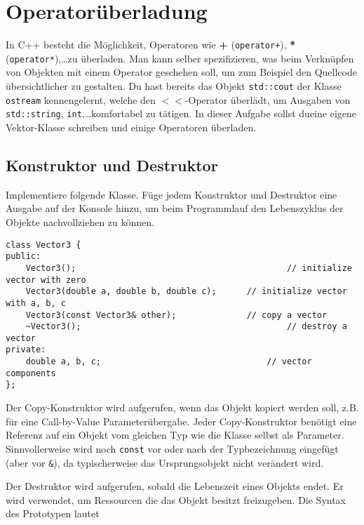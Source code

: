 \section{Operatorüberladung}
In C++ besteht die Möglichkeit, Operatoren wie \textbf{+} (\texttt{operator+}), \textbf{*} (\texttt{operator*}),\dots zu überladen.
Man kann selber spezifizieren, was beim Verknüpfen von Objekten mit einem Operator geschehen soll, um zum Beispiel den Quellcode übersichtlicher zu gestalten.
Du hast bereits das Objekt \texttt{std::cout} der Klasse \texttt{ostream} kennengelernt, welche den $<<$-Operator überlädt, um Ausgaben von \texttt{std::string}, \texttt{int},\dots komfortabel zu tätigen.
In dieser Aufgabe sollst dueine eigene Vektor-Klasse schreiben und einige Operatoren überladen.


\subsection{Konstruktor und Destruktor}
Implementiere folgende Klasse.
Füge jedem Konstruktor und Destruktor eine Ausgabe auf der Konsole hinzu, um beim Programmlauf den Lebenszyklus der Objekte nachvollziehen zu können.

\begin{lstlisting}
class Vector3 {
public:
	Vector3();											// initialize vector with zero
	Vector3(double a, double b, double c);		// initialize vector with a, b, c
	Vector3(const Vector3& other);				// copy a vector
	~Vector3();											// destroy a vector
private:
	double a, b, c;									// vector components
};
\end{lstlisting}

Der Copy-Konstruktor wird aufgerufen, wenn das Objekt kopiert werden soll, z.B. für eine Call-by-Value Parameterübergabe.
Jeder Copy-Konstruktor benötigt eine Referenz auf ein Objekt vom gleichen Typ wie die Klasse selbst als Parameter. 
Sinnvollerweise wird noch \texttt{const} vor oder nach der Typbezeichnung eingefügt (aber vor \texttt{\&}), da typischerweise das Ursprungsobjekt nicht verändert wird.

Der Destruktor wird aufgerufen, sobald die Lebenszeit eines Objekts endet. Er wird verwendet, um Ressourcen die das Objekt besitzt freizugeben.
Die Syntax des Prototypen lautet

